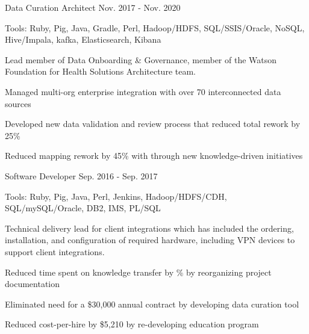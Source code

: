 \begin{cventries}
  \cvexpsubposition
    { Data Curation Architect} %
    {Nov. 2017 - Nov. 2020} %
    {}
    {
      \begin{cvheavyparagraph}
        Tools: Ruby, Pig, Java, Gradle, Perl, Hadoop/HDFS, SQL/SSIS/Oracle, NoSQL, Hive/Impala, kafka, Elasticsearch, Kibana
      \end{cvheavyparagraph}
    }
    {
      \begin{cvparagraph}
        Lead member of Data Onboarding \& Governance, member of the Watson Foundation for Health Solutions Architecture team. 
      \end{cvparagraph}
      \begin{cvitems} %
        \item {Managed multi-org enterprise integration with over 70 interconnected data sources}
        \item {Developed new data validation and review process that reduced total rework by 25\%}
        \item {Reduced mapping rework by 45\% with through new knowledge-driven initiatives}
      \end{cvitems}
    }

  \cvexpsubposition
    {Software Developer} %
    {Sep. 2016 - Sep. 2017} %
    {}
    {
      \begin{cvheavyparagraph}
        Tools: Ruby, Pig, Java, Perl, Jenkins, Hadoop/HDFS/CDH, SQL/mySQL/Oracle, DB2, IMS, PL/SQL
      \end{cvheavyparagraph}
    }
    {
      \begin{cvparagraph}
        Technical delivery lead for client integrations which has included the ordering, installation, and configuration of required hardware, including VPN devices to support client integrations.
      \end{cvparagraph}
      \begin{cvitems} %
        \item {Reduced time spent on knowledge transfer by \% by reorganizing project documentation}
        \item {Eliminated need for a \$30,000 annual contract by developing data curation tool}
        \item {Reduced cost-per-hire by \$5,210 by re-developing education program}
      \end{cvitems}
    }


\end{cventries}
